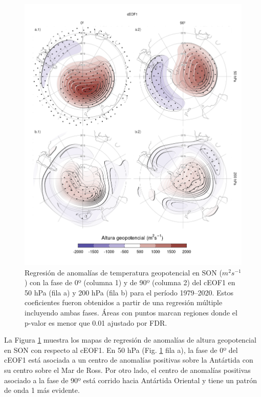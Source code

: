 \documentclass[12pt,oneside,a4paper]{reedthesis}
\begin{document}
\begin{figure}

{\centering \includegraphics{figures/20-ceofs/eof1-regr-gh-1} 

}

\caption{Regresión de anomalías de temperatura geopotencial en SON (\(m^2s^{-1}\)) con la fase de 0º (columna 1) y de 90º (columna 2) del cEOF1 en 50 hPa (fila a) y 200 hPa (fila b) para el período 1979--2020. Estos coeficientes fueron obtenidos a partir de una regresión múltiple incluyendo ambas fases. Áreas con puntos marcan regiones donde el p-valor es menor que 0.01 ajustado por FDR.}\label{fig:eof1-regr-gh}
\end{figure}

La Figura \ref{fig:eof1-regr-gh} muestra los mapas de regresión de anomalías de altura geopotencial en SON con respecto al cEOF1.
En 50 hPa (Fig. \ref{fig:eof1-regr-gh} fila a), la fase de 0º del cEOF1 está asociada a un centro de anomalías positivas sobre la Antártida con su centro sobre el Mar de Ross.
Por otro lado, el centro de anomalías positivas asociado a la fase de 90º está corrido hacia Antártida Oriental y tiene un patrón de onda 1 más evidente.
\end{document}

